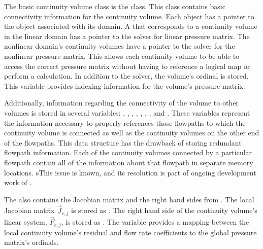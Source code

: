 The basic continuity volume class is the  class.
This class contains basic connectivity information for the continuity volume.
Each  object has a pointer to the  object associated with its domain.
A  that corresponds to a continuity volume in the linear domain has a  pointer to the solver for linear pressure matrix.
The nonlinear domain's continuity volumes have a  pointer to the solver for the nonlinear pressure matrix.
This allows each continuity volume to be able to access the correct pressure matrix without having to reference a logical map or perform a calculation.
In addition to the solver, the volume's ordinal is stored.
This variable provides indexing information for the volume's pressure matrix.

Additionally, information regarding the connectivity of the volume to other volumes is stored in several variables: , , , , , , , and .
These variables represent the information necessary to properly references those flowpaths to which the continuity volume is connected as well as the continuity volumes on the other end of the flowpaths.
This data structure has the drawback of storing redundant flowpath information.
Each of the continuity volumes connected by a particular flowpath contain all of the information about that flowpath in separate memory locations.
sThis issue is known, and its resolution is part of ongoing development work of \cobra{}.

The  also contains the Jacobian matrix and the right hand sides from .
The local Jacobian matrix $\vec{J}_{c, j}$ is stored as .
The right hand side of the continuity volume's linear system, $\vec{F}_{c, j}$, is stored as .
The variable  provides a mapping between the local continuity volume's residual and flow rate coefficients to the global pressure matrix's ordinals.

